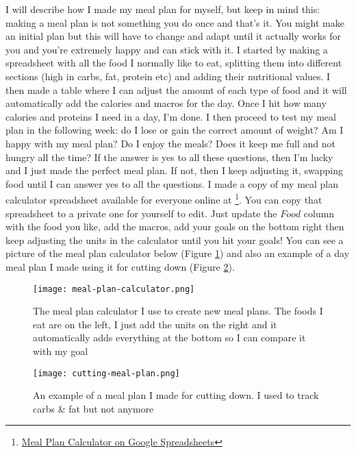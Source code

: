 \documentclass[openany, 12pt]{book}
\begin{document}
        I will describe how I made my meal plan for myself, but keep in mind this: making a meal plan is not something you do once and that's it. You might make an initial plan
        but this will have to change and adapt until it actually works for you and you're extremely happy and can stick with it. I started by making a spreadsheet with all the
        food I normally like to eat, splitting them into different sections (high in carbs, fat, protein etc) and adding their nutritional values. I then made a table where
        I can adjust the amount of each type of food and it will automatically add the calories and macros for the day. Once I hit how many calories and proteins I need in a day, 
        I'm done. I then proceed to test my meal plan in the following week: do I lose or gain the correct amount of weight? Am I happy with my meal plan? Do I enjoy the meals?
        Does it keep me full and not hungry all the time? If the answer is yes to all these questions, then I'm lucky and I just made the perfect meal plan. If not, then I 
        keep adjusting it, swapping food until I can answer yes to all the questions.
        I made a copy of my meal plan calculator spreadsheet available for everyone online at
        \footnote{\href{https://docs.google.com/spreadsheets/d/1DPH4OQuc6yQf3TdUI1D3m1t4UGaiRP1ptWh5f9Y9Y2U/edit}{Meal Plan Calculator on Google Spreadsheets}}.
        You can copy that spreadsheet to a private one for yourself to edit. Just update the $Food$ column with the food you like, add the macros, add your goals on the
        bottom right then keep adjusting the units in the calculator until you hit your goals! You can see a picture of the meal plan calculator below (Figure \ref{fig2}) and 
        also an example of a day meal plan I made using it for cutting down (Figure \ref{fig3}).

	\begin{figure}[h]
		\centering
		\texttt{[image: meal-plan-calculator.png]}
		\caption{The meal plan calculator I use to create new meal plans. The foods I eat are on the left, I just add the units on the right and it automatically adds everything at the bottom so I can compare it with my goal}
		\label{fig2}
	\end{figure}
        
	\begin{figure}[h]
		\centering
		\texttt{[image: cutting-meal-plan.png]}
		\caption{An example of a meal plan I made for cutting down. I used to track carbs \& fat but not anymore}
		\label{fig3}
	\end{figure}
\end{document}
